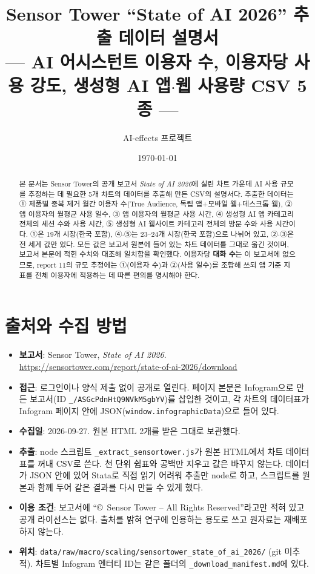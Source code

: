 \documentclass[11pt]{article}
\title{Sensor Tower ``State of AI 2026'' 추출 데이터 설명서\\[2mm]
\large --- AI 어시스턴트 이용자 수, 이용자당 사용 강도, 생성형 AI 앱$\cdot$웹 사용량 CSV 5종 ---}
\author{AI-effects 프로젝트}
\date{\today}
\begin{document}
\maketitle

\begin{abstract}
\noindent 본 문서는 Sensor Tower의 공개 보고서 \textit{State of AI 2026}\parencite{sensortower-2026-state-of-ai}에 실린 차트 가운데 AI 사용 규모를 추정하는 데 필요한 5개 차트의 데이터를 추출해 만든 CSV의 설명서다. 추출한 데이터는 ① 제품별 중복 제거 월간 이용자 수(True Audience, 독립 앱+모바일 웹+데스크톱 웹), ② 앱 이용자의 월평균 사용 일수, ③ 앱 이용자의 월평균 사용 시간, ④ 생성형 AI 앱 카테고리 전체의 세션 수와 사용 시간, ⑤ 생성형 AI 웹사이트 카테고리 전체의 방문 수와 사용 시간이다. ①은 19개 시장(한국 포함), ④$\cdot$⑤는 23--24개 시장(한국 포함)으로 나뉘어 있고, ②$\cdot$③은 전 세계 값만 있다. 모든 값은 보고서 원본에 들어 있는 차트 데이터를 그대로 옮긴 것이며, 보고서 본문에 적힌 수치와 대조해 일치함을 확인했다. 이용자당 \textbf{대화 수}는 이 보고서에 없으므로, report 11의 규모 추정에는 ①(이용자 수)과 ②(사용 일수)를 조합해 쓰되 앱 기준 지표를 전체 이용자에 적용하는 데 따른 편의를 명시해야 한다.
\end{abstract}

\tableofcontents

\section{출처와 수집 방법}

\begin{itemize}
  \item \textbf{보고서}: Sensor Tower, \textit{State of AI 2026}. \url{https://sensortower.com/report/state-of-ai-2026/download}
  \item \textbf{접근}: 로그인이나 양식 제출 없이 공개로 열린다. 페이지 본문은 Infogram으로 만든 보고서(ID \texttt{\_/ASGcPdnHtQ9NVkM5gbYV})를 삽입한 것이고, 각 차트의 데이터표가 Infogram 페이지 안에 JSON(\texttt{window.infographicData})으로 들어 있다.
  \item \textbf{수집일}: 2026-09-27. 원본 HTML 2개를 받은 그대로 보관했다.
  \item \textbf{추출}: node 스크립트 \texttt{\_extract\_sensortower.js}가 원본 HTML에서 차트 데이터표를 꺼내 CSV로 쓴다. 천 단위 쉼표와 공백만 지우고 값은 바꾸지 않는다. 데이터가 JSON 안에 있어 Stata로 직접 읽기 어려워 추출만 node로 하고, 스크립트를 원본과 함께 두어 같은 결과를 다시 만들 수 있게 했다.
  \item \textbf{이용 조건}: 보고서에 ``\copyright\ Sensor Tower -- All Rights Reserved''라고만 적혀 있고 공개 라이선스는 없다. 출처를 밝혀 연구에 인용하는 용도로 쓰고 원자료는 재배포하지 않는다.
  \item \textbf{위치}: \texttt{data/raw/macro/scaling/sensortower\_state\_of\_ai\_2026/} (git 미추적). 차트별 Infogram 엔터티 ID는 같은 폴더의 \texttt{\_download\_manifest.md}에 있다.
\end{itemize}
\end{document}
